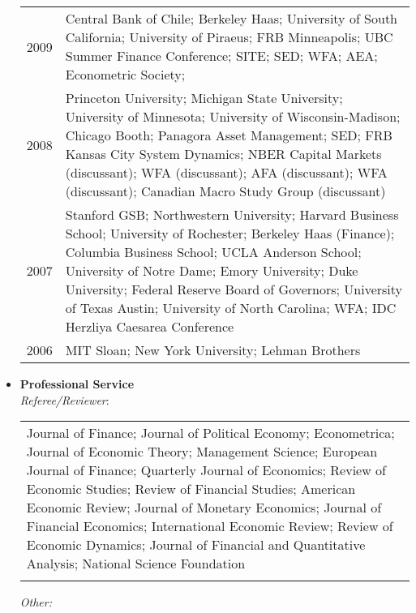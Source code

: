 \documentclass[11pt,letterpaper,serif,overlapped]{res}
\begin{document}
\begin{resume}
\begin{itemize}
\begin{longtable}{lp{15cm}}
2009 & Central Bank of Chile; Berkeley Haas; University of South California;   University of Piraeus; FRB Minneapolis;  UBC Summer Finance Conference; SITE;   SED; WFA; AEA; Econometric Society;\\[0.1cm]
2008 & Princeton University; Michigan State University; University of Minnesota;    University of Wisconsin-Madison; Chicago Booth; Panagora Asset Management; SED;   FRB Kansas City System Dynamics; NBER Capital Markets (discussant); WFA (discussant); AFA (discussant); WFA (discussant); Canadian Macro Study Group (discussant)\\[0.1cm]
2007 & Stanford GSB; Northwestern University; Harvard Business School;   University of Rochester; Berkeley Haas (Finance); Columbia Business School;  UCLA Anderson School; University of Notre Dame;    Emory University; Duke University; Federal Reserve Board of Governors;  University of Texas Austin; University of North Carolina;   WFA; IDC Herzliya Caesarea Conference\\[0.1cm]
2006 & MIT Sloan; New York University; Lehman Brothers\\
\end{longtable}

\vspace{0.5cm}

\newpage
\item \textbf{Professional Service} \\



\emph{Referee/Reviewer}:\\

 \begin{tabular}{p{16cm}}
Journal of Finance; Journal of Political Economy; Econometrica; Journal of Economic Theory; Management Science; European Journal of Finance; Quarterly Journal of Economics; Review of Economic Studies; Review of Financial Studies; American Economic Review;  Journal of Monetary Economics; Journal of Financial Economics; International Economic Review; Review of Economic Dynamics; Journal of Financial and Quantitative Analysis; National Science Foundation\\\\
 \end{tabular}



\emph{Other:}\\


\end{itemize}
\end{resume}
\end{document}
